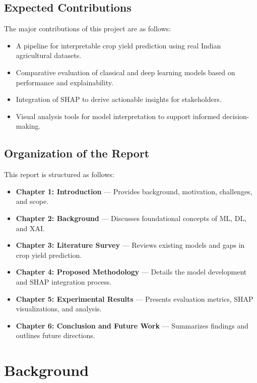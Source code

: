 \documentclass[a4paper,11pt,oneside]{book}
\begin{document}
\section{Expected Contributions}

The major contributions of this project are as follows:

\begin{itemize}
    \item A pipeline for interpretable crop yield prediction using real Indian agricultural datasets.
    \item Comparative evaluation of classical and deep learning models based on performance and explainability.
    \item Integration of SHAP to derive actionable insights for stakeholders.
    \item Visual analysis tools for model interpretation to support informed decision-making.
\end{itemize}

\section{Organization of the Report}

This report is structured as follows:

\begin{itemize}
    \item \textbf{Chapter 1: Introduction} — Provides background, motivation, challenges, and scope.
    \item \textbf{Chapter 2: Background} — Discusses foundational concepts of ML, DL, and XAI.
    \item \textbf{Chapter 3: Literature Survey} — Reviews existing models and gaps in crop yield prediction.
    \item \textbf{Chapter 4: Proposed Methodology} — Details the model development and SHAP integration process.
    \item \textbf{Chapter 5: Experimental Results} — Presents evaluation metrics, SHAP visualizations, and analysis.
    \item \textbf{Chapter 6: Conclusion and Future Work} — Summarizes findings and outlines future directions.
\end{itemize}


\newpage



\chapter{Background}
\end{document}
